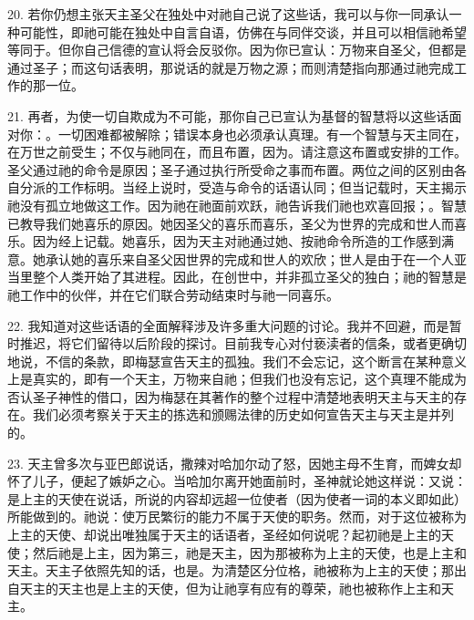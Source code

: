 20. 若你仍想主张天主圣父在独处中对祂自己说了这些话，我可以与你一同承认一种可能性，即祂可能在独处中自言自语，仿佛在与同伴交谈，并且可以相信祂希望等同于。但你自己信德的宣认将会反驳你。因为你已宣认：万物来自圣父，但都是通过圣子；而这句话表明，那说话的就是万物之源；而则清楚指向那通过祂完成工作的那一位。\par

21. 再者，为使一切自欺成为不可能，那你自己已宣认为基督的智慧将以这些话面对你：。一切困难都被解除；错误本身也必须承认真理。有一个智慧与天主同在，在万世之前受生；不仅与祂同在，而且布置，因为。请注意这布置或安排的工作。圣父通过祂的命令是原因；圣子通过执行所受命之事而布置。两位之间的区别由各自分派的工作标明。当经上说时，受造与命令的话语认同；但当记载时，天主揭示祂没有孤立地做这工作。因为祂在祂面前欢跃，祂告诉我们祂也欢喜回报；。智慧已教导我们她喜乐的原因。她因圣父的喜乐而喜乐，圣父为世界的完成和世人而喜乐。因为经上记载。她喜乐，因为天主对祂通过她、按祂命令所造的工作感到满意。她承认她的喜乐来自圣父因世界的完成和世人的欢欣；世人是由于在一个人亚当里整个人类开始了其进程。因此，在创世中，并非孤立圣父的独白；祂的智慧是祂工作中的伙伴，并在它们联合劳动结束时与祂一同喜乐。\par

22. 我知道对这些话语的全面解释涉及许多重大问题的讨论。我并不回避，而是暂时推迟，将它们留待以后阶段的探讨。目前我专心对付亵渎者的信条，或者更确切地说，不信的条款，即梅瑟宣告天主的孤独。我们不会忘记，这个断言在某种意义上是真实的，即有一个天主，万物来自祂；但我们也没有忘记，这个真理不能成为否认圣子神性的借口，因为梅瑟在其著作的整个过程中清楚地表明天主与天主的存在。我们必须考察关于天主的拣选和颁赐法律的历史如何宣告天主与天主是并列的。\par

23. 天主曾多次与亚巴郎说话，撒辣对哈加尔动了怒，因她主母不生育，而婢女却怀了儿子，便起了嫉妒之心。当哈加尔离开她面前时，圣神就论她这样说：又说：是上主的天使在说话，所说的内容却远超一位使者（因为使者一词的本义即如此）所能做到的。祂说：使万民繁衍的能力不属于天使的职务。然而，对于这位被称为上主的天使、却说出唯独属于天主的话语者，圣经如何说呢？起初祂是上主的天使；然后祂是上主，因为第三，祂是天主，因为那被称为上主的天使，也是上主和天主。天主子依照先知的话，也是。为清楚区分位格，祂被称为上主的天使；那出自天主的天主也是上主的天使，但为让祂享有应有的尊荣，祂也被称作上主和天主。\par

